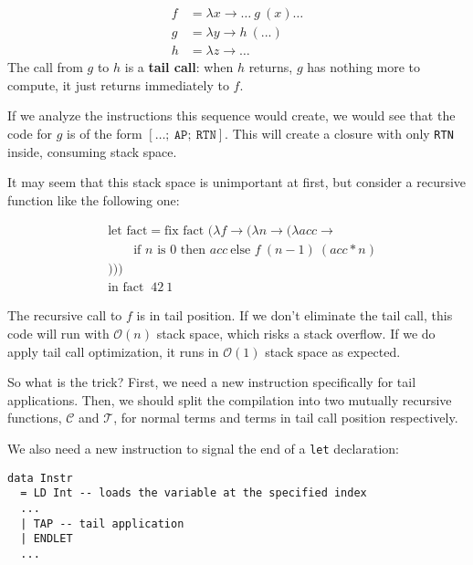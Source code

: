 \[
\begin{aligned}
f &= \lambda x \to \dots \ g \ (x) \dots \\
g &= \lambda y \to h \ (...) \\
h &= \lambda z \to \dots
\end{aligned}
\]
The call from $g$ to $h$ is a \textbf{tail call}: when $h$ returns, $g$ has nothing more to
compute, it just returns immediately to $f$.

If we analyze the instructions this sequence would create, we would see that the code
for $g$ is of the form $ [\dots;\ \texttt{AP};\ \texttt{RTN}] $. This will create a closure with only
\texttt{RTN} inside, consuming stack space.

It may seem that this stack space is unimportant at first, but consider a recursive function
like the following one:

\[
\begin{aligned}
  &\text{let fact} = \text{fix fact } (\lambda f \to (\lambda n \to (\lambda acc \to\\[1mm]
                 &\quad\quad \text{if } n \text{ is 0 then } acc \ \text{else } f \ (n - 1) \ (acc * n)\\[1mm]
                 &)))\\[1mm]
                 &\text{in fact }\ 42\ 1
\end{aligned}
\]

The recursive call to $ f $ is in tail position. If we don't eliminate the tail call,
this code will run with $\mathcal{O}(n)$ stack space, which risks a stack overflow. If we
do apply tail call optimization, it runs in $\mathcal{O}(1)$ stack space as expected.

So what is the trick? First, we need a new instruction specifically for tail applications.
Then, we should split the compilation into two mutually recursive functions, $\mathcal{C}$ and $\mathcal{T}$, for normal terms
and terms in tail call position respectively.

We also need a new instruction to signal the end of a \texttt{let} declaration:

\begin{lstlisting}
data Instr
  = LD Int -- loads the variable at the specified index 
  ...
  | TAP -- tail application
  | ENDLET
  ...
\end{lstlisting}

